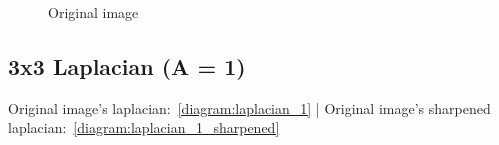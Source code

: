 \begin{figure}[!htb]
\begin{minipage}{0.40\textwidth}
        \caption{Original image}
        \end{minipage}
    \end{figure}


    \subsection{3x3 Laplacian (A = 1)}

    Original image's laplacian:~\ref{diagram:laplacian_1} |
    Original image's sharpened laplacian:~\ref{diagram:laplacian_1_sharpened}

